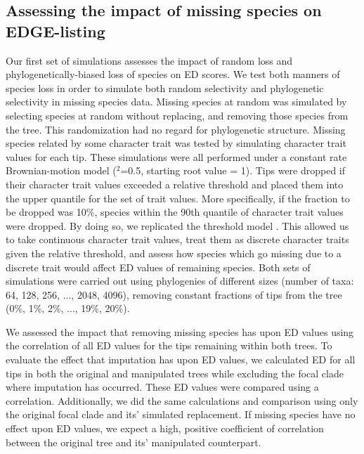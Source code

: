 \documentclass[12pt,english]{article}
\begin{document}
\subsection*{Assessing the impact of missing species on EDGE-listing}
Our first set of simulations assesses the impact of random loss and
phylogenetically-biased loss of species on ED scores. We test both manners of
species loss in order to simulate both random selectivity and phylogenetic
selectivity in missing species data. Missing species at random was simulated by
selecting species at random without replacing, and removing those species from
the tree. This randomization had no regard for phylogenetic structure. Missing
species related by some character trait was tested by simulating character trait
values for each tip. These simulations were all performed under a constant rate
Brownian-motion model (\sigma$^2$=0.5, starting root value = 1). Tips were
dropped if their character trait values exceeded a relative threshold and placed
them into the upper quantile for the set of trait values. More specifically, if
the fraction to be dropped was 10\%, species within the 90th quantile of
character trait values were dropped. By doing so, we replicated the threshold
model \autocite{Felsenstein2005}. This allowed us to take continuous character
trait values, treat them as discrete character traits given the relative
threshold, and assess how species which go missing due to a discrete trait would
affect ED values of remaining species. Both sets of simulations were carried out
using phylogenies of different sizes (number of taxa: 64, 128, 256, ..., 2048,
4096), removing constant fractions of tips from the tree (0\%, 1\%, 2\%, ...,
19\%, 20\%).

We assessed the impact that removing missing species has upon ED values using
the correlation of all ED values for the tips remaining within both trees. To
evaluate the effect that imputation has upon ED values, we calculated ED for all
tips in both the original and manipulated trees while excluding the focal clade
where imputation has occurred. These ED values were compared using a
correlation. Additionally, we did the same calculations and comparison using
only the original focal clade and its' simulated replacement. If missing species
have no effect upon ED values, we expect a high, positive coefficient of
correlation between the original tree and its' manipulated counterpart. 

\end{document}
